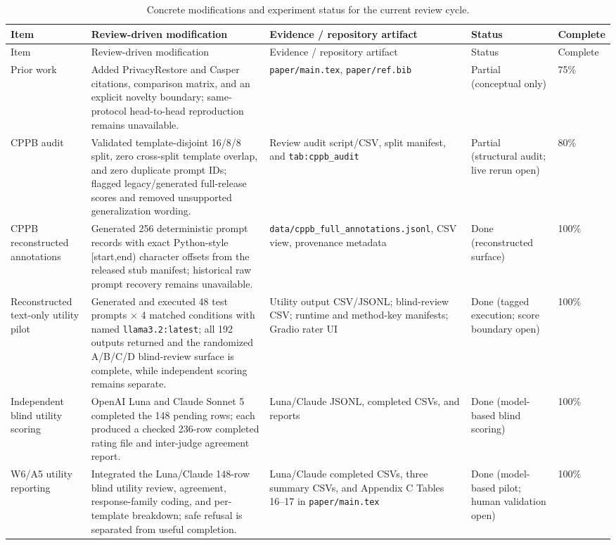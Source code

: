\documentclass[11pt]{article}
\begin{document}
\scriptsize
\begin{longtable}{p{}p{}p{}p{}p{}}
\caption{Concrete modifications and experiment status for the current review cycle.}\label{tab:revision_progress}\\
\toprule
Item & Review-driven modification & Evidence / repository artifact & Status & Complete \\
\midrule
\endfirsthead
\toprule
Item & Review-driven modification & Evidence / repository artifact & Status & Complete \\
\midrule
\endhead
\bottomrule
\endfoot
Prior work & Added PrivacyRestore and Casper citations, comparison matrix, and an explicit novelty boundary; same-protocol head-to-head reproduction remains unavailable. & \texttt{paper/main.tex}, \texttt{paper/ref.bib} & Partial (conceptual only) & 75\% \\
CPPB audit & Validated template-disjoint 16/8/8 split, zero cross-split template overlap, and zero duplicate prompt IDs; flagged legacy/generated full-release scores and removed unsupported generalization wording. & Review audit script/CSV, split manifest, and \texttt{tab:cppb\_audit} & Partial (structural audit; live rerun open) & 80\% \\
CPPB reconstructed annotations & Generated 256 deterministic prompt records with exact Python-style [start,end) character offsets from the released stub manifest; historical raw prompt recovery remains unavailable. & \texttt{data/cppb\_full\_annotations.jsonl}, CSV view, provenance metadata & Done (reconstructed surface) & 100\% \\
Reconstructed text-only utility pilot & Generated and executed 48 test prompts $\times$ 4 matched conditions with named \texttt{llama3.2:latest}; all 192 outputs returned and the randomized A/B/C/D blind-review surface is complete, while independent scoring remains separate. & Utility output CSV/JSONL; blind-review CSV; runtime and method-key manifests; Gradio rater UI & Done (tagged execution; score boundary open) & 100\% \\
Independent blind utility scoring & OpenAI Luna and Claude Sonnet 5 completed the 148 pending rows; each produced a checked 236-row completed rating file and inter-judge agreement report. & Luna/Claude JSONL, completed CSVs, and reports & Done (model-based blind scoring) & 100\% \\
W6/A5 utility reporting & Integrated the Luna/Claude 148-row blind utility review, agreement, response-family coding, and per-template breakdown; safe refusal is separated from useful completion. & Luna/Claude completed CSVs, three summary CSVs, and Appendix C Tables 16--17 in \texttt{paper/main.tex} & Done (model-based pilot; human validation open) & 100\% \\

\end{longtable}
\end{document}

